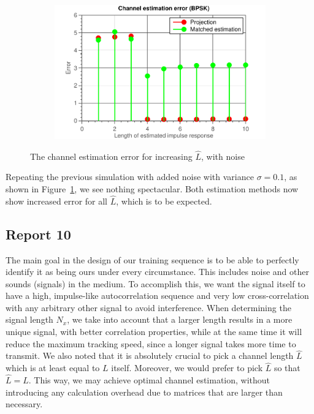 \documentclass[11pt,titlepage]{report}
\begin{document}
\begin{figure}[H]
\begin{subfigure}{0.49\textwidth}
	\end{subfigure}
	\begin{subfigure}{0.49\textwidth}
		\includegraphics[width=\textwidth]{../../deliverable-7-resources/figures/ass-1/report-8-9-10/report-9-noise-0.1/ass-1-report-9-BPSK.pdf}
	\end{subfigure}
	\caption{The channel estimation error for increasing $\hat{L}$, with noise}
	\label{fig:rep9-error-noise}
\end{figure}

Repeating the previous simulation with added noise with variance $\sigma = 0.1$, as shown in Figure~\ref{fig:rep9-error-noise}, we see nothing spectacular. Both estimation methods now show increased error for all $\hat{L}$, which is to be expected. 

\subsection{Report 10}
The main goal in the design of our training sequence is to be able to perfectly identify it as being ours under every circumstance. This includes noise and other sounds (signals) in the medium. To accomplish this, we want the signal itself to have a high, impulse-like autocorrelation sequence and very low cross-correlation with any arbitrary other signal to avoid interference.
When determining the signal length $N_x$, we take into account that a larger length results in a more unique signal, with better correlation properties, while at the same time it will reduce the maximum tracking speed, since a longer signal takes more time to transmit.
We also noted that it is absolutely crucial to pick a channel length $\hat{L}$ which is at least equal to $L$ itself. Moreover, we would prefer to pick $\hat{L}$ so that $\hat{L} = L$. This way, we may achieve optimal channel estimation, without introducing any calculation overhead due to matrices that are larger than necessary.
\end{document}
